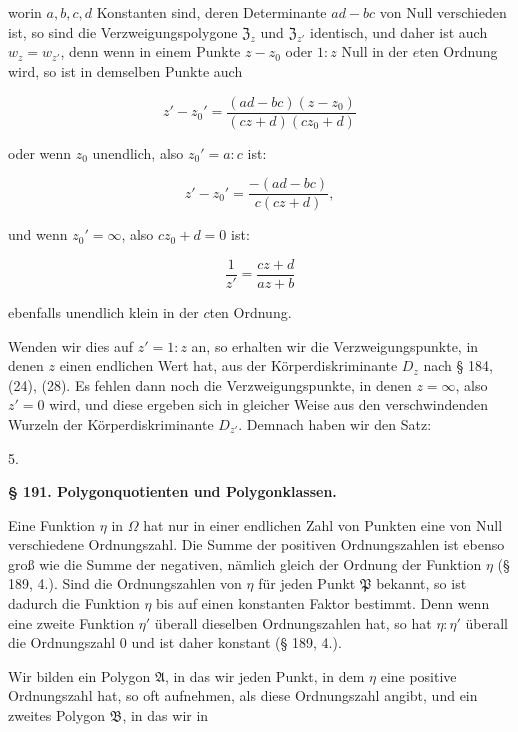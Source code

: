 worin $a, b, c, d$ Konstanten sind, deren Determinante $ad - bc$ von Null verschieden ist, so sind die Verzweigungspolygone $\mathfrak{Z}_z$ und $\mathfrak{Z}_{z'}$ identisch, und daher ist auch $w_z = w_{z'}$, denn wenn in einem Punkte $z-z_0$ oder $1:z$ Null in der $e$ten Ordnung wird, so ist in demselben Punkte auch

\[
z' - z_0' = \dfrac{(ad-bc)(z-z_0)}{(cz+d)(cz_0+d)}
\]

oder wenn $z_0$ unendlich, also $z_0' = a:c$ ist:

\[
z' - z_0' = \dfrac{-(ad-bc)}{c(cz+d)},
\]

und wenn $z_0' = \infty$, also $cz_0+d = 0$ ist:

\[
\dfrac{1}{z'} = \dfrac{cz+d}{az+b}
\]

ebenfalls unendlich klein in der $c$ten Ordnung.

Wenden wir dies auf $z' = 1:z$ an, so erhalten wir die Verzweigungspunkte, in denen $z$ einen endlichen Wert hat, aus der Körperdiskriminante $D_z$ nach § 184, (24), (28). Es fehlen dann noch die Verzweigungspunkte, in denen $z=\infty$, also $z'=0$ wird, und diese ergeben sich in gleicher Weise aus den verschwindenden Wurzeln der Körperdiskriminante $D_{z'}$. Demnach haben wir den Satz:

5. 

\begin{center}
\textbf{§ 191. Polygonquotienten und Polygonklassen.}
\end{center}

Eine Funktion $\eta$ in $\Omega$ hat nur in einer endlichen Zahl von Punkten eine von Null verschiedene Ordnungszahl. Die Summe der positiven Ordnungszahlen ist ebenso groß wie die Summe der negativen, nämlich gleich der Ordnung der Funktion $\eta$ (§ 189, 4.). Sind die Ordnungszahlen von $\eta$ für jeden Punkt $\mathfrak{P}$ bekannt, so ist dadurch die Funktion $\eta$ bis auf einen konstanten Faktor bestimmt. Denn wenn eine zweite Funktion $\eta'$ überall dieselben Ordnungszahlen hat, so hat $\eta:\eta'$ überall die Ordnungszahl $0$ und ist daher konstant (§ 189, 4.).

Wir bilden ein Polygon $\mathfrak{A}$, in das wir jeden Punkt, in dem $\eta$ eine positive Ordnungszahl hat, so oft aufnehmen, als diese Ordnungszahl angibt, und ein zweites Polygon $\mathfrak{B}$, in das wir in
